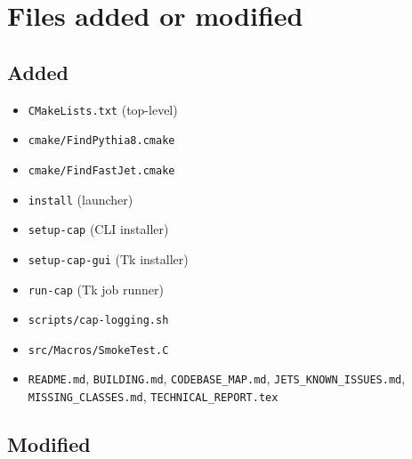 \documentclass[11pt,a4paper]{article}
\begin{document}
\appendix
\section{Files added or modified}

\subsection*{Added}

\begin{itemize}[leftmargin=2em,itemsep=0pt]
  \item \texttt{CMakeLists.txt} (top-level)
  \item \texttt{cmake/FindPythia8.cmake}
  \item \texttt{cmake/FindFastJet.cmake}
  \item \texttt{install} (launcher)
  \item \texttt{setup-cap} (CLI installer)
  \item \texttt{setup-cap-gui} (Tk installer)
  \item \texttt{run-cap} (Tk job runner)
  \item \texttt{scripts/cap-logging.sh}
  \item \texttt{src/Macros/SmokeTest.C}
  \item \texttt{README.md}, \texttt{BUILDING.md},
        \texttt{CODEBASE\_MAP.md}, \texttt{JETS\_KNOWN\_ISSUES.md},
        \texttt{MISSING\_CLASSES.md}, \texttt{TECHNICAL\_REPORT.tex}
\end{itemize}

\subsection*{Modified}
\end{document}

